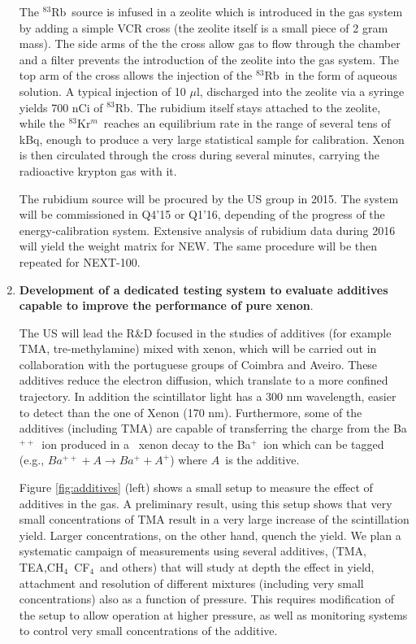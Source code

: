 \begin{enumerate}
The $^{83}$Rb~source is infused in a zeolite which is introduced in the gas system by adding a simple VCR cross (the zeolite itself is a small piece of 2 gram mass). The side arms of the the cross allow gas to flow through the chamber and a filter prevents the introduction of the zeolite into the gas system. The top arm of the cross allows the injection of the $^{83}$Rb~in the form of aqueous solution. A typical injection of 10 $\mu$l, discharged into the zeolite via a syringe yields 700 nCi of $^{83}$Rb. The rubidium itself stays attached to the zeolite, while the $^{83}$Kr$^m$~reaches an equilibrium rate in the range of several tens of kBq, enough to produce a very large statistical sample for calibration. Xenon is then circulated through the cross during several minutes, carrying the radioactive krypton gas with it.  

The rubidium source will be procured by the US group in 2015. The system will be commissioned in Q4'15 or Q1'16, depending of the progress of the energy-calibration system. Extensive analysis of rubidium data during 2016 will yield the weight matrix for NEW. The same procedure will be then repeated for NEXT-100. 

\item {\bf Development of a dedicated testing system to evaluate additives capable to improve the performance of pure xenon}. 

The US will lead the R\&D focused in the studies of additives (for example TMA, tre-methylamine) mixed with xenon, which will be carried out in collaboration with the portuguese groups of Coimbra and Aveiro. These additives reduce the electron diffusion, which translate to a more confined trajectory.  In addition the scintillator light has  a 300 nm wavelength, easier to detect than the one of Xenon (170 nm). Furthermore, some of the additives (including TMA) are capable of transferring the charge from the Ba$^{++}$~ion produced in a \bb\ xenon decay to
the Ba$^{+}$~ion which can be tagged (e.g., $Ba^{++} + A \rightarrow Ba^{+} + A^{+}$) where $A$~is the additive. 

Figure \ref{fig:additives} (left) shows a small setup to measure the effect of additives in the gas. A preliminary result, using this setup shows that very small concentrations of TMA result in a very large increase of the scintillation yield. Larger concentrations, on the other hand, quench the yield. We plan a systematic campaign of measurements using several additives, (TMA, TEA,CH$_4$~CF$_4$~and others) that will study at depth the effect in yield, attachment and resolution of different mixtures (including very small concentrations) also as a function of pressure. This requires modification of the setup to allow operation at higher pressure, as well as monitoring systems to control very small concentrations of the additive. 


\end{enumerate}
